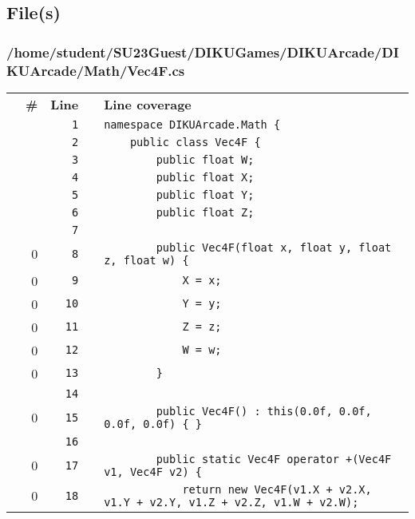 \documentclass[a4paper,landscape,10pt]{article}
\begin{document}
\subsection{File(s)}
\subsubsection{/home/student/SU23Guest/DIKUGames/DIKUArcade/DIKUArcade/Math/Vec4F.cs}
\begin{longtable}[l]{lrrll}
\textbf{} & \textbf{\#} & \textbf{Line} & \textbf{} & \textbf{Line coverage}\\
\cellcolor{gray} &  & \verb~1~ & & \verb~namespace DIKUArcade.Math {~\\
\cellcolor{gray} &  & \verb~2~ & & \verb~    public class Vec4F {~\\
\cellcolor{gray} &  & \verb~3~ & & \verb~        public float W;~\\
\cellcolor{gray} &  & \verb~4~ & & \verb~        public float X;~\\
\cellcolor{gray} &  & \verb~5~ & & \verb~        public float Y;~\\
\cellcolor{gray} &  & \verb~6~ & & \verb~        public float Z;~\\
\cellcolor{gray} &  & \verb~7~ & & \verb~~\\
\cellcolor{red} & 0 & \verb~8~ & & \verb~        public Vec4F(float x, float y, float z, float w) {~\\
\cellcolor{red} & 0 & \verb~9~ & & \verb~            X = x;~\\
\cellcolor{red} & 0 & \verb~10~ & & \verb~            Y = y;~\\
\cellcolor{red} & 0 & \verb~11~ & & \verb~            Z = z;~\\
\cellcolor{red} & 0 & \verb~12~ & & \verb~            W = w;~\\
\cellcolor{red} & 0 & \verb~13~ & & \verb~        }~\\
\cellcolor{gray} &  & \verb~14~ & & \verb~~\\
\cellcolor{red} & 0 & \verb~15~ & & \verb~        public Vec4F() : this(0.0f, 0.0f, 0.0f, 0.0f) { }~\\
\cellcolor{gray} &  & \verb~16~ & & \verb~~\\
\cellcolor{red} & 0 & \verb~17~ & & \verb~        public static Vec4F operator +(Vec4F v1, Vec4F v2) {~\\
\cellcolor{red} & 0 & \verb~18~ & & \verb~            return new Vec4F(v1.X + v2.X, v1.Y + v2.Y, v1.Z + v2.Z, v1.W + v2.W);~\\

\end{longtable}
\end{document}

